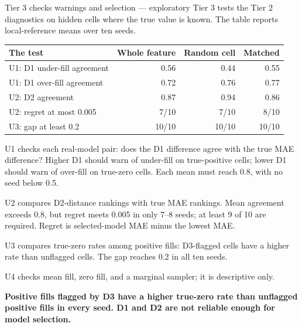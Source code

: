 \begin{frame}{Tier 3 checks warnings and selection --- exploratory}
\fontsize{7.6}{9.2}\selectfont
Tier 3 tests the Tier 2 diagnostics on hidden cells where the true value is known. The table reports local-reference means over ten seeds.
\par\medskip
\begin{center}\begin{tabular}{lrrr}\hline
The test & Whole feature & Random cell & Matched \\\hline
U1: D1 under-fill agreement & 0.56 & 0.44 & 0.55 \\
U1: D1 over-fill agreement & 0.72 & 0.76 & 0.77 \\
U2: D2 agreement & 0.87 & 0.94 & 0.86 \\
U2: regret at most 0.005 & 7/10 & 7/10 & 8/10 \\
U3: gap at least 0.2 & 10/10 & 10/10 & 10/10 \\
\hline\end{tabular}\end{center}U1 checks each real-model pair: does the D1 difference agree with the true MAE difference? Higher D1 should warn of under-fill on true-positive cells; lower D1 should warn of over-fill on true-zero cells. Each mean must reach 0.8, with no seed below 0.5.\par\medskip U2 compares D2-distance rankings with true MAE rankings. Mean agreement exceeds 0.8, but regret meets 0.005 in only 7--8 seeds; at least 9 of 10 are required. Regret is selected-model MAE minus the lowest MAE.\par\medskip U3 compares true-zero rates among positive fills: D3-flagged cells have a higher rate than unflagged cells. The gap reaches 0.2 in all ten seeds.\par\medskip U4 checks mean fill, zero fill, and a marginal sampler; it is descriptive only.
\par\medskip
\textbf{Positive fills flagged by D3 have a higher true-zero rate than unflagged positive fills in every seed. D1 and D2 are not reliable enough for model selection.}
\end{frame}

